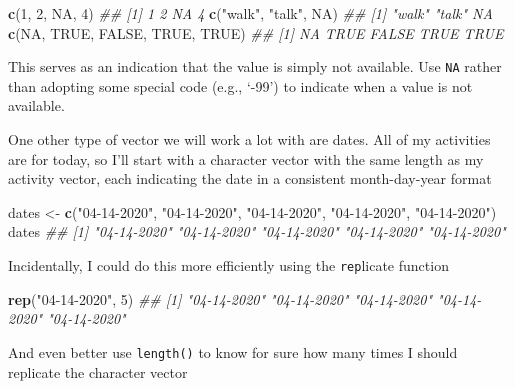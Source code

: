 \documentclass[
]{book}
\newenvironment{Shaded}{\begin{snugshade}}{\end{snugshade}}
\newcommand{\CommentTok}[1]{\textcolor[rgb]{0.56,0.35,0.01}{\textit{#1}}}
\newcommand{\DecValTok}[1]{\textcolor[rgb]{0.00,0.00,0.81}{#1}}
\newcommand{\KeywordTok}[1]{\textcolor[rgb]{0.13,0.29,0.53}{\textbf{#1}}}
\newcommand{\NormalTok}[1]{#1}
\newcommand{\OtherTok}[1]{\textcolor[rgb]{0.56,0.35,0.01}{#1}}
\newcommand{\StringTok}[1]{\textcolor[rgb]{0.31,0.60,0.02}{#1}}
\begin{document}
\begin{Shaded}
\begin{Highlighting}[]
\KeywordTok{c}\NormalTok{(}\DecValTok{1}\NormalTok{, }\DecValTok{2}\NormalTok{, }\OtherTok{NA}\NormalTok{, }\DecValTok{4}\NormalTok{)}
\CommentTok{## [1]  1  2 NA  4}
\KeywordTok{c}\NormalTok{(}\StringTok{"walk"}\NormalTok{, }\StringTok{"talk"}\NormalTok{, }\OtherTok{NA}\NormalTok{)}
\CommentTok{## [1] "walk" "talk" NA}
\KeywordTok{c}\NormalTok{(}\OtherTok{NA}\NormalTok{, }\OtherTok{TRUE}\NormalTok{, }\OtherTok{FALSE}\NormalTok{, }\OtherTok{TRUE}\NormalTok{, }\OtherTok{TRUE}\NormalTok{)}
\CommentTok{## [1]    NA  TRUE FALSE  TRUE  TRUE}
\end{Highlighting}
\end{Shaded}

This serves as an indication that the value is simply not available. Use \texttt{NA} rather than adopting some special code (e.g., `-99') to indicate when a value is not available.

One other type of vector we will work a lot with are dates. All of my activities are for today, so I'll start with a character vector with the same length as my activity vector, each indicating the date in a consistent month-day-year format

\begin{Shaded}
\begin{Highlighting}[]
\NormalTok{dates <-}\StringTok{ }\KeywordTok{c}\NormalTok{(}\StringTok{"04-14-2020"}\NormalTok{, }\StringTok{"04-14-2020"}\NormalTok{, }\StringTok{"04-14-2020"}\NormalTok{, }\StringTok{"04-14-2020"}\NormalTok{, }\StringTok{"04-14-2020"}\NormalTok{)}
\NormalTok{dates}
\CommentTok{## [1] "04-14-2020" "04-14-2020" "04-14-2020" "04-14-2020" "04-14-2020"}
\end{Highlighting}
\end{Shaded}

Incidentally, I could do this more efficiently using the \texttt{rep}licate function

\begin{Shaded}
\begin{Highlighting}[]
\KeywordTok{rep}\NormalTok{(}\StringTok{"04-14-2020"}\NormalTok{, }\DecValTok{5}\NormalTok{)}
\CommentTok{## [1] "04-14-2020" "04-14-2020" "04-14-2020" "04-14-2020" "04-14-2020"}
\end{Highlighting}
\end{Shaded}

And even better use \texttt{length()} to know for sure how many times I should replicate the character vector
\end{document}
